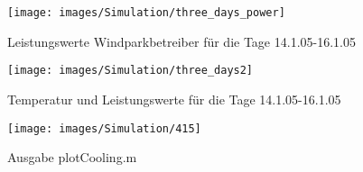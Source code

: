 \begin{figure}[h] \begin{center}
\texttt{[image: images/Simulation/three\_days\_power]} \end{center}
\vspace{-25pt} \caption{Leistungswerte Windparkbetreiber f\"ur die Tage
14.1.05-16.1.05} \label{fig:threep} \end{figure}

\begin{figure}[h]
\begin{center}
\texttt{[image: images/Simulation/three\_days2]}
\end{center}
\vspace{-25pt}
\caption{Temperatur und Leistungswerte f\"ur die Tage 14.1.05-16.1.05}
\label{fig:threet}
\end{figure}


\begin{figure}[h]
	\begin{center}
	\texttt{[image: images/Simulation/415]}
	\end{center}
\caption{Ausgabe plotCooling.m}
\label{fig:ausgabe}
\end{figure}


